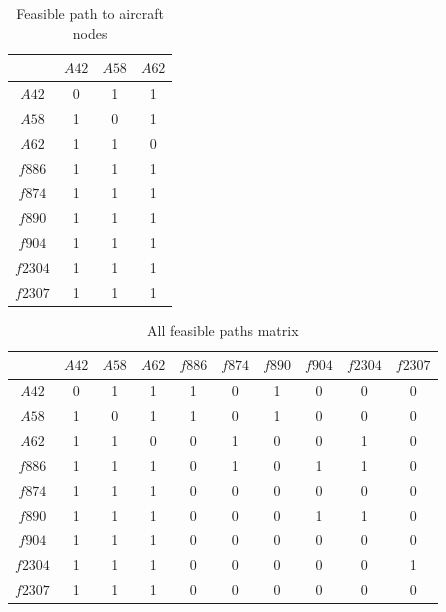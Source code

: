 \documentclass[senior]{IPSstyle}
\begin{document}
\begin{table}[h]
\renewcommand{\arraystretch}{1}
\caption{Feasible path to aircraft nodes}
\label{a2a & f2a}
\begin{center}
\begin{tabular}{|c|c|c|c|}
\hline
\multicolumn{1}{|c|}{}
&\multicolumn{1}{|c|}{\(A42\)}
&\multicolumn{1}{c|}{\(A58\)}
&\multicolumn{1}{c|}{\(A62\)}
\\  \hline
\(A42\) & 0 & 1 & 1
\\	\hline
\(A58\) & 1 & 0 & 1
\\	\hline
\(A62\) & 1 & 1 & 0 
\\  \hline
\(f886\) & 1 & 1 & 1
\\	\hline
\(f874\) & 1 & 1 & 1
\\	\hline
\(f890\) & 1 & 1 & 1
\\  \hline
\(f904\) & 1 & 1 & 1
\\  \hline
\(f2304\) & 1 & 1 & 1
\\  \hline
\(f2307\) & 1 & 1 & 1
\\  \hline
\end{tabular}
\end{center}
\end{table}

\begin{table}[h]
\renewcommand{\arraystretch}{1}
\caption{All feasible paths matrix}
\label{all paths}
\begin{center}
\begin{tabular}{|c|c|c|c|c|c|c|c|c|c|}
\hline
\multicolumn{1}{|c|}{}
&\multicolumn{1}{|c|}{\(A42\)}
&\multicolumn{1}{c|}{\(A58\)}
&\multicolumn{1}{c|}{\(A62\)}
&\multicolumn{1}{|c|}{\(f886\)}
&\multicolumn{1}{c|}{\(f874\)}
&\multicolumn{1}{c|}{\(f890\)}
&\multicolumn{1}{c|}{\(f904\)}
&\multicolumn{1}{c|}{\(f2304\)}
&\multicolumn{1}{c|}{\(f2307\)}
\\  \hline
\(A42\) & 0 & 1 & 1 & 1 & 0 & 1 & 0 & 0 & 0
\\	\hline
\(A58\) & 1 & 0 & 1 & 1 & 0 & 1 & 0 & 0 & 0
\\	\hline
\(A62\) & 1 & 1 & 0 & 0 & 1 & 0 & 0 & 1 & 0
\\  \hline
\(f886\) & 1 & 1 & 1 & 0 & 1 & 0 & 1 & 1 & 0
\\	\hline
\(f874\) & 1 & 1 & 1 & 0 & 0 & 0 & 0 & 0 & 0
\\	\hline
\(f890\) & 1 & 1 & 1 & 0 & 0 & 0 & 1 & 1 & 0
\\  \hline
\(f904\) & 1 & 1 & 1 & 0 & 0 & 0 & 0 & 0 & 0
\\  \hline
\(f2304\) & 1 & 1 & 1 & 0 & 0 & 0 & 0 & 0 & 1
\\  \hline
\(f2307\) & 1 & 1 & 1 & 0 & 0 & 0 & 0 & 0 & 0
\\  \hline
\end{tabular}
\end{center}
\end{table}
\end{document}

